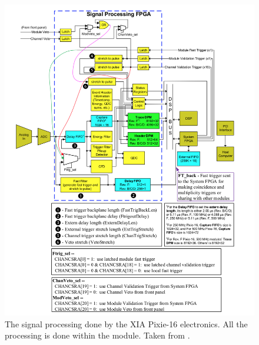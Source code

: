 \begin{figure}
    \centering
    \includegraphics[scale=0.75]{Setup_Figs/pixie_electronics.png}
    \caption{The signal processing done by the XIA Pixie-16 electronics. All the processing is done within the module. Taken from \citep{xia:_pixie}.}
    \label{fig:pixie_electronics}
\end{figure}